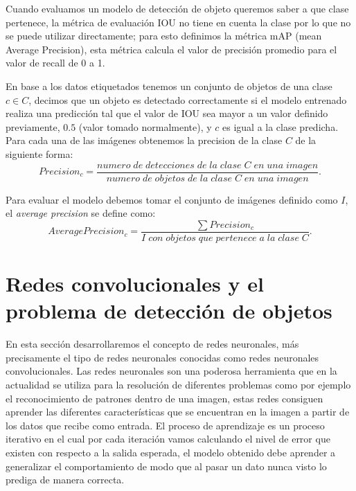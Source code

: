 Cuando evaluamos un modelo de detección de objeto queremos saber a que clase pertenece, la métrica de evaluación IOU no tiene en cuenta la clase por lo que no se puede utilizar directamente; para esto definimos la métrica mAP (mean Average Precision), esta métrica calcula el valor de precisión promedio para el valor de recall de 0 a 1.

En base a los datos etiquetados tenemos un conjunto de objetos de una clase $c \in C$, decimos que un objeto es detectado correctamente si el modelo entrenado realiza una predicción tal que el valor de IOU sea mayor a un valor definido previamente, $0.5$ (valor tomado normalmente), y $c$ es igual a la clase predicha. Para cada una de las imágenes obtenemos la precision de la clase $C$ de la siguiente forma:
\begin{equation}
Precision_c = \frac{numero\;de\;detecciones\;de\;la\;clase\;C\;en\;una\;imagen}{numero\;de\;objetos\;de\;la\;clase\;C\;en\;una\;imagen}.
\end{equation}

Para evaluar el modelo debemos tomar el conjunto de imágenes definido como $I$, el \textit{average precision} se define como:
\begin{equation}
Average Precision_c = \frac{\sum Precision_c}{I\;con\;objetos\;que\;pertenece\;a\;la\;clase\;C}.
\end{equation}



\section{Redes convolucionales y el problema de detección de objetos}\label{sec:compueter-vision}

En esta sección desarrollaremos el concepto de redes neuronales, más precisamente el tipo de  redes neuronales conocidas como redes neuronales convolucionales. Las redes neuronales son una poderosa herramienta que en la actualidad se utiliza para la resolución de diferentes problemas como por ejemplo el reconocimiento de patrones dentro de una imagen, estas redes consiguen aprender las diferentes características que se encuentran en la imagen a partir de los datos que recibe como entrada. El proceso de aprendizaje es un proceso iterativo en el cual por cada iteración vamos calculando el nivel de error que existen con respecto a la salida esperada, el modelo obtenido debe aprender a generalizar el comportamiento de modo que al pasar un dato nunca visto lo prediga de manera correcta. 

